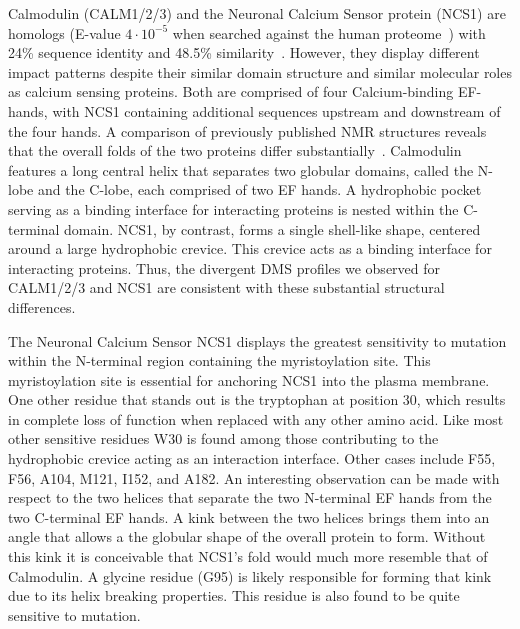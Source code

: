 Calmodulin (CALM1/2/3) and the Neuronal Calcium Sensor protein (NCS1) are homologs (E-value $4 \cdot 10^{-5}$ when searched against the human proteome~\cite{altschul_basic_1990,the_uniprot_consortium_uniprot:_2015}) with 24\% sequence identity and 48.5\% similarity~\cite{rice_emboss:_2000}. However, they display different impact patterns despite their similar domain structure and similar molecular roles as calcium sensing proteins. Both are comprised of four Calcium-binding EF-hands, with NCS1 containing additional sequences upstream and downstream of the four hands. A comparison of previously published NMR structures reveals that the overall folds of the two proteins differ substantially~\cite{sarhan_crystallographic_2012,heidarsson_c-terminal_2012}. Calmodulin features a long central helix that separates two globular domains, called the N-lobe and the C-lobe, each comprised of two EF hands. A hydrophobic pocket serving as a binding interface for interacting proteins is nested within the C-terminal domain. NCS1, by contrast, forms a single shell-like shape, centered around a large hydrophobic crevice. This crevice acts as a binding interface for interacting proteins. Thus, the divergent DMS profiles we observed for CALM1/2/3 and NCS1 are consistent with these substantial structural differences.

The Neuronal Calcium Sensor NCS1 displays the greatest sensitivity to mutation within the N-terminal region containing the myristoylation site.  This myristoylation site is essential for anchoring NCS1 into the plasma membrane. One other residue that stands out is the tryptophan at position 30, which results in complete loss of function when replaced with any other amino acid. Like most other sensitive residues W30 is found among those contributing to the hydrophobic crevice acting as an interaction interface. Other cases include F55, F56, A104, M121, I152, and A182. An interesting observation can be made with respect to the two helices that separate the two N-terminal EF hands from the two C-terminal EF hands. A kink between the two helices brings them into an angle that allows a the globular shape of the overall protein to form. Without this kink it is conceivable that NCS1's fold would much more resemble that of Calmodulin. A glycine residue (G95) is likely responsible for forming that kink due to its helix breaking properties. This residue is also found to be quite sensitive to mutation.

